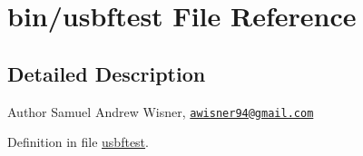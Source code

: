 \hypertarget{usbftest}{\section{bin/usbftest File Reference}
\label{usbftest}
}


\subsection{Detailed Description}
\begin{DoxyAuthor}{Author}
Samuel Andrew Wisner, \href{mailto:awisner94@gmail.com}{\tt awisner94@gmail.\+com} 
\end{DoxyAuthor}


Definition in file \hyperlink{usbftest_source}{usbftest}.

